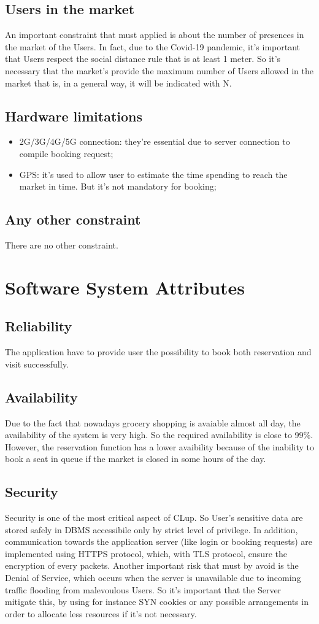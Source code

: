 \subsection{Users in the market}
An important constraint that must applied is about the number of presences in the market of the Users. In fact, due to the Covid-19 pandemic, it's important that Users respect the social distance rule that is at least 1 meter. So it's necessary that the market's provide the maximum number of Users allowed in the market that is, in a general way, it will be indicated with N.


\subsection{Hardware limitations}
\begin{itemize}
\item 2G/3G/4G/5G connection: they're essential due to server connection to compile booking request;
\item GPS: it's used to allow user to estimate the time spending to reach the market in time. But it's not mandatory for booking;
\end{itemize}
\subsection{Any other constraint}
There are no other constraint.
\section{Software System Attributes}
\subsection{Reliability}
The application have to provide user the possibility to book both reservation and visit successfully. 

\subsection{Availability}
Due to the fact that nowadays grocery shopping is avaiable almost all day, the availability of the system is very high. So the required availability is close to 99\%. However, the reservation function has a lower avaibility because of the inability to book a seat in queue if the market is closed in some hours of the day. 
\subsection{Security}
Security is one of the most critical aspect of CLup. So User's sensitive data are stored safely in DBMS accessibile only by strict level of privilege. In addition, communication towards the application server (like login or booking requests) are implemented using  HTTPS protocol, which, with TLS protocol, ensure the encryption of every packets. Another important risk that must by avoid is the Denial of Service, which occurs when the server is unavailable due to incoming traffic flooding from malevoulous Users. So it's important that the Server mitigate this, by using for instance SYN cookies or any possible arrangements in order to allocate less resources if it's not necessary.

